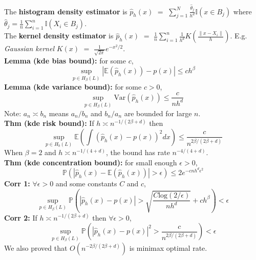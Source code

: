 \documentclass[10pt,twocolumn]{article}
\begin{document}
    The \textbf{histogram density estimator} is 
        $\hat{p}_h(x)$ $=$ $\sum_{j=1}^N \frac{\hat{\theta}_j}{h^d} \mathbb{I}(x \in B_j)$
        where $\hat{\theta}_j = \frac{1}{n} \sum_{i=1}^n \mathbb{I}(X_i \in B_j)$.\\
    The \textbf{kernel density estimator} is 
    $\hat{p}_h(x)$ $=$ $\frac{1}{n} \sum_{i=1}^n \frac{1}{h^d} K \left( \frac{\| x-X_i \|}{h}  \right).$
    E.g. \emph{Gaussian kernel} $K(x)$ $=$ $\frac{1}{\sqrt{2\pi}} e^{-x^2/2}$.\\
    \textbf{Lemma (kde bias bound):} for some $c$, 
    \begin{equation}
        \sup_{p \in H_{\beta}(L)} |\mathbb{E}\left(\hat{p}_h(x)\right) - p(x)| \leq ch^{\beta}
    \end{equation}
    \textbf{Lemma (kde variance bound):} for some $c>0$, 
    \begin{equation}
        \sup_{p \in H_{\beta}(L)} \text{Var}(\hat{p}_h(x)) \leq \frac{c}{nh^d}
    \end{equation}
    Note: $a_n \asymp b_n$ means $a_n/b_n$ and $b_n/a_n$ are bounded for large $n$.\\
    \textbf{Thm (kde risk bound):} If $h \asymp n^{-1/(2\beta + d)}$ then
    \begin{equation}
        \sup_{p \in H_b(L)} \mathbb{E} \left( \int (\hat{p}_h(x) - p(x))^2 dx \right) 
        \leq \frac{c}{n^{2\beta/(2\beta+d)}}
    \end{equation}
    When $\beta=2$ and $h \asymp n^{-1/(4+d)}$, the bound has rate $n^{-4/(4+d)}$.\\
    \textbf{Thm (kde concentration bound):} for small enough $\epsilon >0$,
    \begin{equation}
        \mathbb{P}(|\hat{p}_h(x) - \mathbb{E}(\hat{p}_h(x))| > \epsilon) 
            \leq 2 e^{-cnh^d \epsilon^2}
    \end{equation}
    \textbf{Corr 1:} $\forall \epsilon>0$ and some constants $C$ and $c$,
    \begin{equation}
        \sup_{p \in H_{\beta}(L)} \mathbb{P} \left( | \hat{p}_h(x) - p(x) | > \sqrt{ \frac{C\text{log}(2/\epsilon)}{nh^d} } + ch^{\beta} \right)
            < \epsilon
    \end{equation}
    \textbf{Corr 2:} If $h \asymp n^{-1/(2\beta + d)}$ then $\forall \epsilon >0$,
    \begin{equation}
        \sup_{p \in H_{\beta}(L)} \mathbb{P} \left( | \hat{p}_h(x) - p(x) |^2 > \frac{c}{n^{2\beta/(2\beta + d)}} \right)
            < \epsilon
    \end{equation}
    We also proved that $O(n^{-2\beta/(2\beta + d)})$ is minimax optimal rate.
\end{document}

